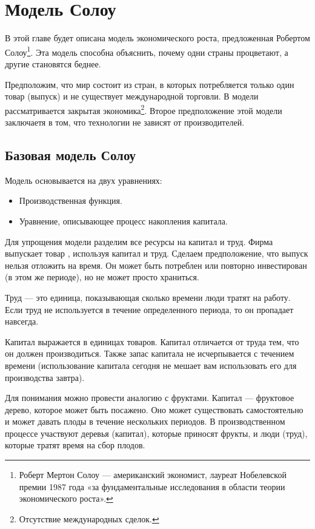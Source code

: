 \chapter{Модель Солоу}
\label{cha:solow_models}

В этой главе будет описана модель экономического роста, предложенная Робертом Солоу\footnote{Роберт Мертон Солоу --- американский экономист, лауреат Нобелевской премии 1987 года «за фундаментальные исследования в области теории экономического роста»\cite{wiki_solow}.}.
Эта модель способна объяснить, почему одни страны процветают, а другие становятся беднее.

Предположим, что мир состоит из стран, в которых потребляется только один товар (выпуск) и не существует международной торговли.
В модели рассматривается закрытая экономика\footnote{Отсутствие международных сделок.}.
Второе предположение этой модели заключаетя в том, что технологии не зависят от производителей.

\section{Базовая модель Солоу}

Модель основывается на двух уравнениях:
\begin{itemize}
	\item Производственная функция.
	\item Уравнение, описывающее процесс накопления капитала.
\end{itemize}

Для упрощения модели разделим все ресурсы на капитал и труд.
Фирма выпускает товар , используя капитал и труд.
Сделаем предположение, что выпуск нельзя отложить на время.
Он может быть потреблен или повторно инвестирован (в этом же периоде), но не может просто храниться.

Труд --- это единица, показывающая сколько времени люди тратят на работу.
Если труд не используется в течение определенного периода, то он пропадает навсегда.

Капитал выражается в единицах товаров.
Капитал отличается от труда тем, что он должен производиться.
Также запас капитала не исчерпывается с течением времени (использование капитала сегодня не мешает вам использовать его для производства завтра).

Для понимания можно провести аналогию с фруктами.
Капитал --- фруктовое дерево, которое может быть посажено.
Оно может существовать самостоятельно и может давать плоды в течение нескольких периодов.
В производственном процессе участвуют деревья (капитал), которые приносят фрукты, и люди (труд), которые тратят время на сбор плодов.

